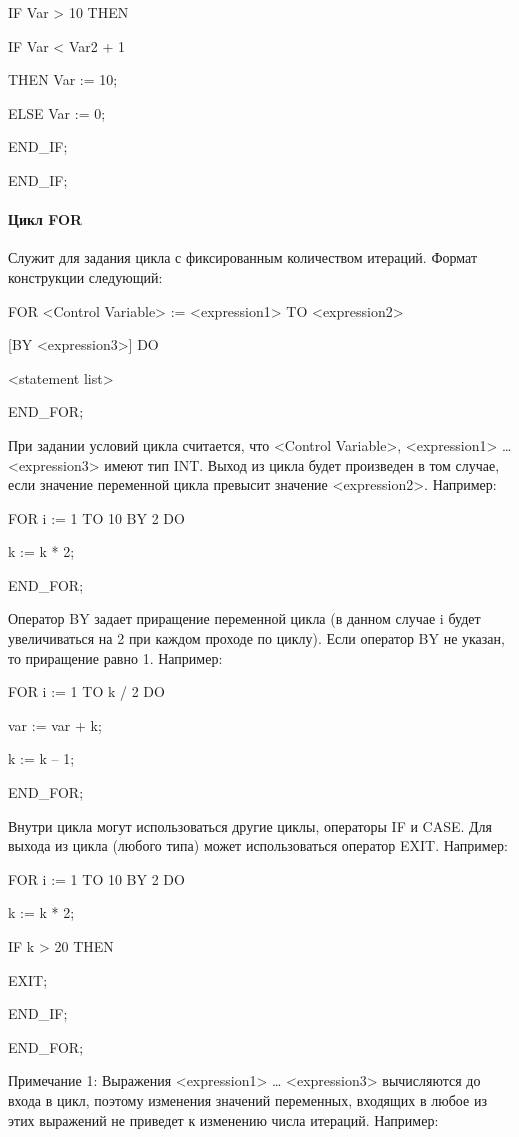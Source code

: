 \documentclass[letterpaper,10pt,russian]{sphinxmanual}
\begin{document}
IF Var \textgreater{} 10 THEN

IF Var \textless{} Var2 + 1

THEN Var := 10;

ELSE Var := 0;

END\_IF;

END\_IF;


\paragraph{Цикл FOR}
\label{iec_guide/st_guide:for}
Служит для задания цикла с фиксированным количеством итераций. Формат
конструкции следующий:

FOR \textless{}Control Variable\textgreater{} := \textless{}expression1\textgreater{} TO \textless{}expression2\textgreater{}

{[}BY \textless{}expression3\textgreater{}{]} DO

\textless{}statement list\textgreater{}

END\_FOR;

При задании условий цикла считается, что \textless{}Control Variable\textgreater{},
\textless{}expression1\textgreater{} … \textless{}expression3\textgreater{} имеют тип INT. Выход из цикла будет
произведен в том случае, если значение переменной цикла превысит
значение \textless{}expression2\textgreater{}. Например:

FOR i := 1 TO 10 BY 2 DO

k := k * 2;

END\_FOR;

Оператор BY задает приращение переменной цикла (в данном случае i будет
увеличиваться на 2 при каждом проходе по циклу). Если оператор BY не
указан, то приращение равно 1. Например:

FOR i := 1 TO k / 2 DO

var := var + k;

k := k – 1;

END\_FOR;

Внутри цикла могут использоваться другие циклы, операторы IF и CASE. Для
выхода из цикла (любого типа) может использоваться оператор EXIT.
Например:

FOR i := 1 TO 10 BY 2 DO

k := k * 2;

IF k \textgreater{} 20 THEN

EXIT;

END\_IF;

END\_FOR;

Примечание 1: Выражения \textless{}expression1\textgreater{} … \textless{}expression3\textgreater{} вычисляются до
входа в цикл, поэтому изменения значений переменных, входящих в любое из
этих выражений не приведет к изменению числа итераций. Например:
\end{document}
